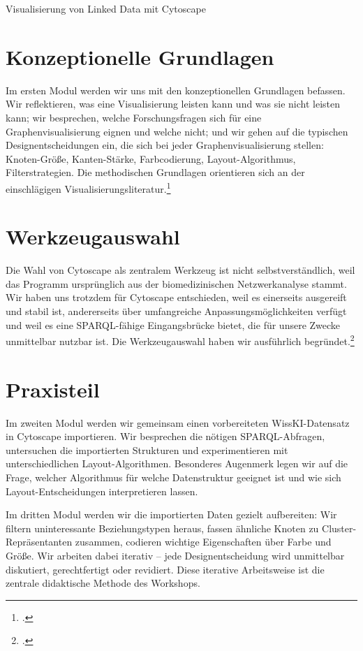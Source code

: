 \begin{beitrag}{Visualisierung von Linked Data mit Cytoscape}
\section{Konzeptionelle Grundlagen}
Im ersten Modul werden wir uns mit den konzeptionellen Grundlagen befassen. Wir reflektieren, was eine Visualisierung leisten kann und was sie nicht leisten kann; wir besprechen, welche Forschungsfragen sich für eine Graphenvisualisierung eignen und welche nicht; und wir gehen auf die typischen Designentscheidungen ein, die sich bei jeder Graphenvisualisierung stellen: Knoten-Größe, Kanten-Stärke, Farbcodierung, Layout-Algorithmus, Filterstrategien. Die methodischen Grundlagen orientieren sich an der einschlägigen Visualisierungsliteratur.\footcite[78]{ullmann2024-visualisierung}

\section{Werkzeugauswahl}
Die Wahl von Cytoscape als zentralem Werkzeug ist nicht selbstverständlich, weil das Programm ursprünglich aus der biomedizinischen Netzwerkanalyse stammt. Wir haben uns trotzdem für Cytoscape entschieden, weil es einerseits ausgereift und stabil ist, andererseits über umfangreiche Anpassungsmöglichkeiten verfügt und weil es eine SPARQL-fähige Eingangsbrücke bietet, die für unsere Zwecke unmittelbar nutzbar ist. Die Werkzeugauswahl haben wir ausführlich begründet.\footcite[11]{vogt2025-werkzeugauswahl}

\section{Praxisteil}
Im zweiten Modul werden wir gemeinsam einen vorbereiteten WissKI-Datensatz in Cytoscape importieren. Wir besprechen die nötigen SPARQL-Abfragen, untersuchen die importierten Strukturen und experimentieren mit unterschiedlichen Layout-Algorithmen. Besonderes Augenmerk legen wir auf die Frage, welcher Algorithmus für welche Datenstruktur geeignet ist und wie sich Layout-Entscheidungen interpretieren lassen.

Im dritten Modul werden wir die importierten Daten gezielt aufbereiten: Wir filtern uninteressante Beziehungstypen heraus, fassen ähnliche Knoten zu Cluster-Repräsentanten zusammen, codieren wichtige Eigenschaften über Farbe und Größe. Wir arbeiten dabei iterativ -- jede Designentscheidung wird unmittelbar diskutiert, gerechtfertigt oder revidiert. Diese iterative Arbeitsweise ist die zentrale didaktische Methode des Workshops.


\end{beitrag}
